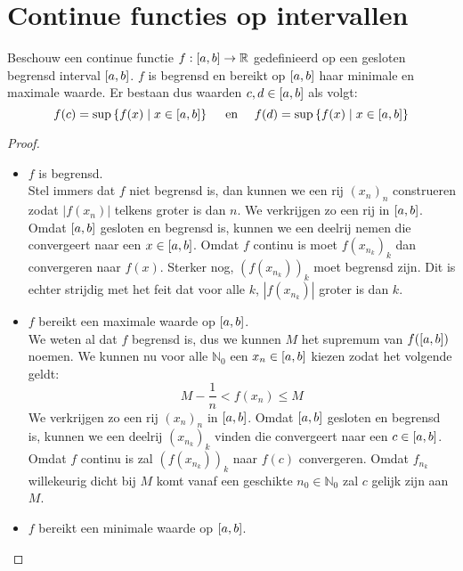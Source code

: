 \documentclass[main.tex]{subfiles}
\begin{document}
\section{Continue functies op intervallen}
\label{sec:continue-functies-op}

\begin{bst}
  Beschouw een continue functie $f: \interval{a}{b} \rightarrow \mathbb{R}$ gedefinieerd op een gesloten begrensd interval $\interval{a}{b}$.
  $f$ is begrensd en bereikt op $\interval{a}{b}$ haar minimale en maximale waarde.
  Er bestaan dus waarden $c,d \in \interval{a}{b}$ als volgt:
  \[ f(c) = \sup\left\{ f(x) \mid x \in \interval{a}{b} \right\} \quad\text{ en }\quad f(d) = \sup\left\{ f(x) \mid x \in \interval{a}{b} \right\} \]

  \begin{proof}
    \begin{itemize}
    \item $f$ is begrensd.\\
      Stel immers dat $f$ niet begrensd is, dan kunnen we een rij $(x_{n})_{n}$ construeren zodat $|f(x_{n})|$ telkens groter is dan $n$.
      We verkrijgen zo een rij in $\interval{a}{b}$.
      Omdat $\interval{a}{b}$ gesloten en begrensd is, kunnen we een deelrij nemen die convergeert naar een $x\in\interval{a}{b}$.
      Omdat $f$ continu is moet $f(x_{n_{k}})_{k}$ dan convergeren naar $f(x)$.
      Sterker nog, $(f(x_{n_{k}}))_{k}$ moet begrensd zijn.
      Dit is echter strijdig met het feit dat voor alle $k$, $|f(x_{n_{k}})|$ groter is dan $k$.
    \item $f$ bereikt een maximale waarde op $\interval{a}{b}$.\\
      We weten al dat $f$ begrensd is, dus we kunnen $M$ het supremum van $f(\interval{a}{b})$ noemen.
      We kunnen nu voor alle $\mathbb{N}_{0}$ een $x_{n} \in \interval{a}{b}$ kiezen zodat het volgende geldt:\waarom
      \[ M- \frac{1}{n} < f(x_{n}) \le M \]
      We verkrijgen zo een rij $(x_{n})_{n}$ in $\interval{a}{b}$.
      Omdat $\interval{a}{b}$ gesloten en begrensd is, kunnen we een deelrij $(x_{n_{k}})_{k}$ vinden die convergeert naar een $c\in \interval{a}{b}$.
      Omdat $f$ continu is zal $(f(x_{n_{k}}))_{k}$ naar $f(c)$ convergeren.
      Omdat $f_{n_{k}}$ willekeurig dicht bij $M$ komt vanaf een geschikte $n_{0}\in\mathbb{N}_{0}$ zal $c$ gelijk zijn aan $M$.
    \item $f$ bereikt een minimale waarde op $\interval{a}{b}$.\\
    \end{itemize}
  \end{proof}
\end{bst}
\end{document}

